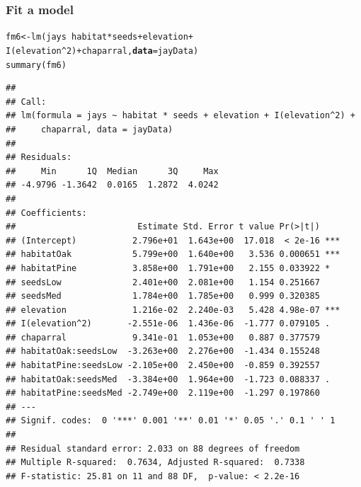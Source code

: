 \documentclass[color=usenames,dvipsnames]{beamer}\usepackage[]{graphicx}\usepackage[]{color}
\makeatletter
\newcommand{\hlnum}[1]{\textcolor[rgb]{0.69,0.494,0}{#1}}%
\newcommand{\hlopt}[1]{\textcolor[rgb]{0,0,0}{#1}}%
\newcommand{\hlstd}[1]{\textcolor[rgb]{0,0,0}{#1}}%
\newcommand{\hlkwb}[1]{\textcolor[rgb]{0,0.341,0.682}{#1}}%
\newcommand{\hlkwc}[1]{\textcolor[rgb]{0,0,0}{\textbf{#1}}}%
\newcommand{\hlkwd}[1]{\textcolor[rgb]{0.004,0.004,0.506}{#1}}%
\newenvironment{kframe}{%
 \def\at@end@of@kframe{}%
 \ifinner\ifhmode%
  \def\at@end@of@kframe{\end{minipage}}%
  \begin{minipage}{\columnwidth}%
 \fi\fi%
 \def\FrameCommand##1{\hskip\@totalleftmargin \hskip-\fboxsep
 \colorbox{shadecolor}{##1}\hskip-\fboxsep
     \hskip-\linewidth \hskip-\@totalleftmargin \hskip\columnwidth}%
 \MakeFramed {\advance\hsize-\width
   \@totalleftmargin\z@ \linewidth\hsize
   \@setminipage}}%
 {\par\unskip\endMakeFramed%
 \at@end@of@kframe}
\newenvironment{knitrout}{}{} %
\makeatother
\begin{document}
\begin{frame}[fragile]
  \frametitle{Fit a model}
  \vspace{-2mm}
\begin{knitrout}\tiny
{}\color{fgcolor}\begin{kframe}
\begin{alltt}
\hlstd{fm6} \hlkwb{<-} \hlkwd{lm}\hlstd{(jays} \hlopt{~} \hlstd{habitat} \hlopt{*} \hlstd{seeds} \hlopt{+} \hlstd{elevation} \hlopt{+}
          \hlkwd{I}\hlstd{(elevation}\hlopt{^}\hlnum{2}\hlstd{)} \hlopt{+}  \hlstd{chaparral,} \hlkwc{data}\hlstd{=jayData)}
\hlkwd{summary}\hlstd{(fm6)}
\end{alltt}
\begin{verbatim}
## 
## Call:
## lm(formula = jays ~ habitat * seeds + elevation + I(elevation^2) + 
##     chaparral, data = jayData)
## 
## Residuals:
##     Min      1Q  Median      3Q     Max 
## -4.9796 -1.3642  0.0165  1.2872  4.0242 
## 
## Coefficients:
##                        Estimate Std. Error t value Pr(>|t|)    
## (Intercept)           2.796e+01  1.643e+00  17.018  < 2e-16 ***
## habitatOak            5.799e+00  1.640e+00   3.536 0.000651 ***
## habitatPine           3.858e+00  1.791e+00   2.155 0.033922 *  
## seedsLow              2.401e+00  2.081e+00   1.154 0.251667    
## seedsMed              1.784e+00  1.785e+00   0.999 0.320385    
## elevation             1.216e-02  2.240e-03   5.428 4.98e-07 ***
## I(elevation^2)       -2.551e-06  1.436e-06  -1.777 0.079105 .  
## chaparral             9.341e-01  1.053e+00   0.887 0.377579    
## habitatOak:seedsLow  -3.263e+00  2.276e+00  -1.434 0.155248    
## habitatPine:seedsLow -2.105e+00  2.450e+00  -0.859 0.392557    
## habitatOak:seedsMed  -3.384e+00  1.964e+00  -1.723 0.088337 .  
## habitatPine:seedsMed -2.749e+00  2.119e+00  -1.297 0.197860    
## ---
## Signif. codes:  0 '***' 0.001 '**' 0.01 '*' 0.05 '.' 0.1 ' ' 1
## 
## Residual standard error: 2.033 on 88 degrees of freedom
## Multiple R-squared:  0.7634,	Adjusted R-squared:  0.7338 
## F-statistic: 25.81 on 11 and 88 DF,  p-value: < 2.2e-16
\end{verbatim}
\end{kframe}
\end{knitrout}
\end{frame}
\end{document}
